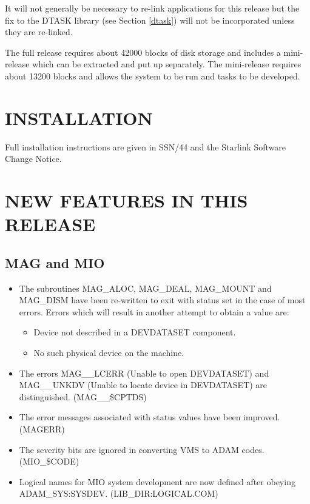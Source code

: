 It will not generally be necessary to re-link applications for this release but
the fix to the DTASK library (see Section \ref{dtask}) will not be incorporated
unless they are re-linked.

The full release requires about 42000 blocks of disk storage and includes a
mini-release which can be extracted and put up separately.
The mini-release requires about 13200 blocks and allows the system to be run
and tasks to be developed.

\section{INSTALLATION}
Full installation instructions are given in SSN/44 and the Starlink Software
Change Notice.

\section{NEW FEATURES IN THIS RELEASE}

\subsection{MAG and MIO}
\label{mag}
\begin{itemize}
\item The subroutines MAG\_ALOC, MAG\_DEAL, MAG\_MOUNT and MAG\_DISM have been
re-written to exit with status set in the case of most errors.
Errors which will result in another attempt to obtain a value are:
\begin{itemize}
\item Device not described in a DEVDATASET component.
\item No such physical device on the machine.
\end{itemize}

\item The errors MAG\_\_LCERR (Unable to open DEVDATASET) and MAG\_\_UNKDV
(Unable to locate device in DEVDATASET) are distinguished. (MAG\_\_\$CPTDS)

\item The error messages associated with status values have been improved.
(MAGERR)

\item The severity bits are ignored in converting VMS to ADAM codes.
(MIO\_\$CODE)

\item Logical names for MIO system development are now defined after obeying
ADAM\_SYS:SYSDEV. (LIB\_DIR:LOGICAL.COM)
\end{itemize}

